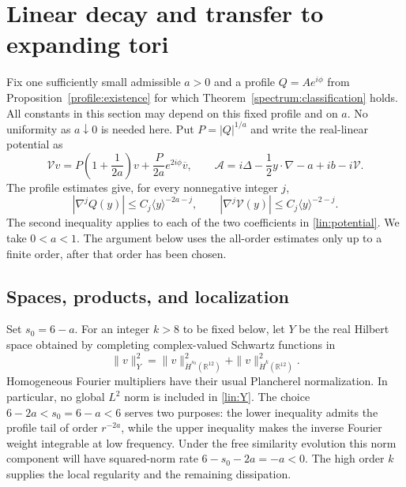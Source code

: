 \section{Linear decay and transfer to expanding tori}\label{sec:linear}

Fix one sufficiently small admissible $a>0$ and a profile $Q=Ae^{i\phi}$
from Proposition~\ref{profile:existence} for which
Theorem~\ref{spectrum:classification} holds.  All constants in this section
may depend on this fixed profile and on $a$.  No uniformity as $a\downarrow0$
is needed here.  Put $P=|Q|^{1/a}$ and write the real-linear potential as
\begin{equation}\label{lin:potential}
 \mathcal Vv=P\left(1+\frac1{2a}\right)v
       +\frac{P}{2a}e^{2i\phi}\overline v,
 \qquad
 \mathcal A=i\Delta-\frac12y\cdot\nabla-a+ib-i\mathcal V.
\end{equation}
The profile estimates give, for every nonnegative integer $j$,
\begin{equation}\label{lin:symbol-hypotheses}
 |\nabla^j Q(y)|\le C_j\langle y\rangle^{-2a-j},\qquad
 |\nabla^j\mathcal V(y)|\le C_j\langle y\rangle^{-2-j}.
\end{equation}
The second inequality applies to each of the two coefficients in
\eqref{lin:potential}.  We take $0<a<1$.  The argument below uses the
all-order estimates only up to a finite order, after that order has been
chosen.

\subsection{Spaces, products, and localization}

Set $s_0=6-a$.  For an integer $k>8$ to be fixed below, let $Y$ be the real
Hilbert space obtained by completing complex-valued Schwartz functions in
\begin{equation}\label{lin:Y}
 \|v\|_Y^2=\|v\|_{\dot H^{s_0}(\mathbb R^{12})}^2
                      +\|v\|_{\dot H^k(\mathbb R^{12})}^2.
\end{equation}
Homogeneous Fourier multipliers have their usual Plancherel normalization.
In particular, no global $L^2$ norm is included in \eqref{lin:Y}.
The choice $6-2a<s_0=6-a<6$ serves two purposes: the lower inequality
admits the profile tail of order $r^{-2a}$, while the upper inequality
makes the inverse Fourier weight integrable at low frequency. Under the
free similarity evolution this norm component will have squared-norm
rate $6-s_0-2a=-a<0$. The high order $k$ supplies the local regularity
and the remaining dissipation.

